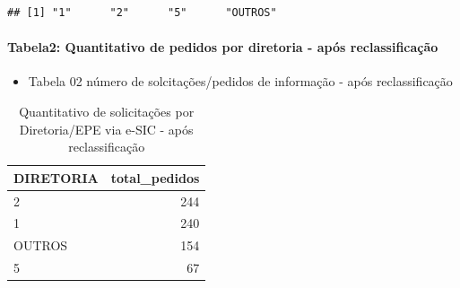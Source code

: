 \documentclass[]{article}
\newenvironment{Shaded}{\begin{snugshade}}{\end{snugshade}}
\newcommand{\DataTypeTok}[1]{\textcolor[rgb]{0.13,0.29,0.53}{#1}}
\newcommand{\KeywordTok}[1]{\textcolor[rgb]{0.13,0.29,0.53}{\textbf{#1}}}
\newcommand{\NormalTok}[1]{#1}
\newcommand{\OperatorTok}[1]{\textcolor[rgb]{0.81,0.36,0.00}{\textbf{#1}}}
\newcommand{\OtherTok}[1]{\textcolor[rgb]{0.56,0.35,0.01}{#1}}
\newcommand{\StringTok}[1]{\textcolor[rgb]{0.31,0.60,0.02}{#1}}
\providecommand{\tightlist}{%
  \setlength{\itemsep}{0pt}\setlength{\parskip}{0pt}}
\let\oldparagraph\paragraph
\renewcommand{\paragraph}[1]{\oldparagraph{#1}\mbox{}}
\begin{document}
\begin{verbatim}
## [1] "1"      "2"      "5"      "OUTROS"
\end{verbatim}

\hypertarget{tabela2-quantitativo-de-pedidos-por-diretoria---apos-reclassificacao}{%
\paragraph{Tabela2: Quantitativo de pedidos por diretoria - após
reclassificação}\label{tabela2-quantitativo-de-pedidos-por-diretoria---apos-reclassificacao}}

\begin{itemize}
\tightlist
\item
  Tabela 02 número de solcitações/pedidos de informação - após
  reclassificação
\end{itemize}

\begin{Shaded}
\end{Shaded}

\begin{table}[!h]

\caption{\label{tab:unnamed-chunk-25}Quantitativo de solicitações por Diretoria/EPE via e-SIC - após reclassificação}
\centering
\begin{tabular}{lr}
\toprule
DIRETORIA & total\_pedidos\\
\midrule
\rowcolor{gray!6}  2 & 244\\
1 & 240\\
\rowcolor{gray!6}  OUTROS & 154\\
5 & 67\\
\bottomrule
\end{tabular}
\end{table}
\end{document}
